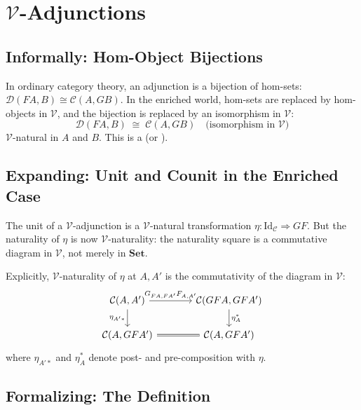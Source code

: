 \section{$\mathcal{V}$-Adjunctions}
\label{sec:enriched-adjunctions}

\subsection{Informally: Hom-Object Bijections}

In ordinary category theory, an adjunction is a bijection of hom-sets:
$\mathcal{D}(FA, B) \cong \mathcal{C}(A, GB)$. In the enriched world, hom-sets
are replaced by hom-objects in $\mathcal{V}$, and the bijection is replaced by
an isomorphism in $\mathcal{V}$:
\begin{equation*}
  \mathcal{D}(FA, B) \;\cong\; \mathcal{C}(A, GB)
  \quad \text{(isomorphism in } \mathcal{V}\text{)}
\end{equation*}
$\mathcal{V}$-natural in $A$ and $B$. This is a 
(or ).

\subsection{Expanding: Unit and Counit in the Enriched Case}

The unit of a $\mathcal{V}$-adjunction is a $\mathcal{V}$-natural transformation
$\eta : \mathrm{Id}_\mathcal{C} \Rightarrow GF$. But the naturality of $\eta$ is
now $\mathcal{V}$-naturality: the naturality square is a commutative diagram in
$\mathcal{V}$, not merely in $\mathbf{Set}$.

Explicitly, $\mathcal{V}$-naturality of $\eta$ at $A, A'$ is the commutativity
of the diagram in $\mathcal{V}$:
\begin{equation*}
\begin{tikzcd}[column sep=large]
  \mathcal{C}(A, A') \arrow[r, "G_{FA,FA'}F_{A,A'}"] \arrow[d, "\eta_{A'*}" '] &
  \mathcal{C}(GFA, GFA') \arrow[d, "\eta_A^*"] \\
  \mathcal{C}(A, GFA') \arrow[r, equal] & \mathcal{C}(A, GFA')
\end{tikzcd}
\end{equation*}
where $\eta_{A'*}$ and $\eta_A^*$ denote post- and pre-composition with $\eta$.

\subsection{Formalizing: The Definition}

